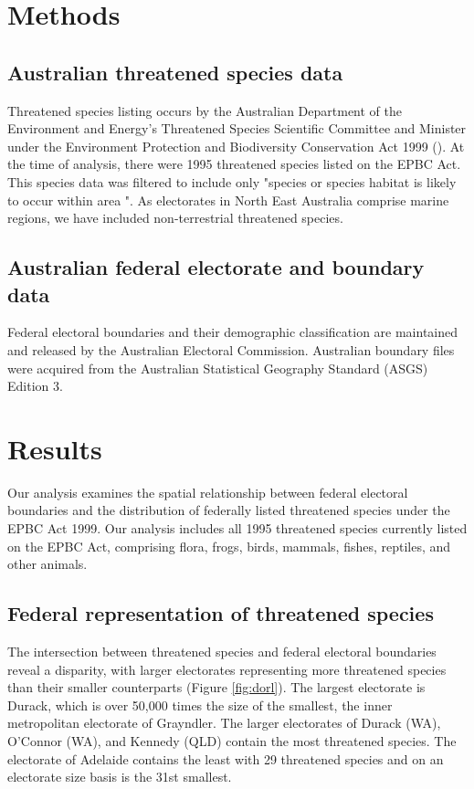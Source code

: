 \documentclass[a4paper,11pt]{article}
\begin{document}
\section{Methods}

\subsection{Australian threatened species data}
Threatened species listing occurs by the Australian Department of the Environment and Energy’s Threatened Species Scientific Committee and Minister under the Environment Protection and Biodiversity Conservation Act 1999 (\cite{commonwealthofaustraliaThreatenedSpeciesEPBC2021}). At the time of analysis, there were 1995 threatened species listed on the EPBC Act. This species data was filtered to include only "species or species habitat is likely to occur within area ".
As electorates in North East Australia comprise marine regions, we have included non-terrestrial threatened species.


\subsection{Australian federal electorate and boundary data}
Federal electoral boundaries and their demographic classification are maintained and released by the Australian Electoral Commission.
Australian boundary files were acquired from the Australian Statistical Geography Standard (ASGS) Edition 3.


\section{Results}
Our analysis examines the spatial relationship between federal electoral boundaries and the distribution of federally listed threatened species under the EPBC Act 1999. Our analysis includes all 1995 threatened species currently listed on the EPBC Act, comprising flora, frogs, birds, mammals, fishes, reptiles, and other animals. 


\subsection{Federal representation of threatened species}
The intersection between threatened species and federal electoral boundaries reveal a disparity, with larger electorates representing more threatened species than their smaller counterparts (Figure \ref{fig:dorl}). The largest electorate is Durack, which is over 50,000 times the size of the smallest, the inner metropolitan electorate of Grayndler. The larger electorates of Durack (WA), O'Connor (WA), and Kennedy (QLD) contain the most threatened species. The electorate of Adelaide contains the least with 29 threatened species and on an electorate size basis is the 31st smallest. 
\end{document}
